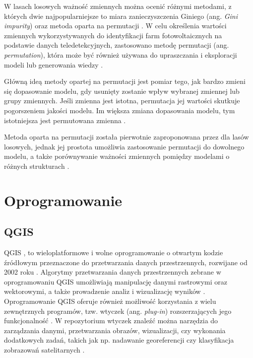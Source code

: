 \documentclass{amuthesis}
\begin{document}
W lasach losowych ważność zmiennych można ocenić różnymi metodami, z
których dwie najpopularniejsze to miara zanieczyszczenia Giniego (ang.
\emph{Gini impurity}) oraz metoda oparta na permutacji
\autocite{R-Przewodnik}. W celu określenia wartości zmiennych
wykorzystywanych do identyfikacji farm fotowoltaicznych na podstawie
danych teledetekcyjnych, zastosowano metodę permutacji (ang.
\emph{permutation}), która może być również używana do upraszczania i
eksploracji modeli lub generowania wiedzy
\autocite{biecek_2021_model_analysis}.

Główną ideą metody opartej na permutacji jest pomiar tego, jak bardzo
zmieni się dopasowanie modelu, gdy usunięty zostanie wpływ wybranej
zmiennej lub grupy zmiennych. Jeśli zmienna jest istotna, permutacja jej
wartości skutkuje pogorszeniem jakości modelu. Im większa zmiana
dopasowania modelu, tym istotniejsza jest permutowana zmienna
\autocite{biecek_2021_model_analysis}.

Metoda oparta na permutacji została pierwotnie zaproponowana przez
\textcite{breiman_2001_rf} dla lasów losowych, jednak jej prostota
umożliwia zastosowanie permutacji do dowolnego modelu, a także
porównywanie ważności zmiennych pomiędzy modelami o różnych strukturach
\autocite{biecek_2021_model_analysis}.

\hypertarget{oprogramowanie}{%
\section{Oprogramowanie}\label{oprogramowanie}}

\hypertarget{qgis}{%
\subsection{QGIS}\label{qgis}}

QGIS \autocite{qgis}, to wieloplatformowe i wolne oprogramowanie o
otwartym kodzie źródłowym przeznaczone do przetwarzania danych
przestrzennych, rozwijane od 2002 roku
\autocite{hejmanowska_2020_dane,flenniken_2020_qgis}. Algorytmy
przetwarzania danych przestrzennych zebrane w oprogramowaniu QGIS
umożliwiają manipulację danymi rastrowymi oraz wektorowymi, a także
prowadzenie analiz i wizualizację wyników
\autocite{hejmanowska_2020_dane}. Oprogramowanie QGIS oferuje również
możliwość korzystania z wielu zewnętrznych programów, tzw. wtyczek (ang.
\emph{plug-in}) rozszerzających jego funkcjonalność
\autocite{hejmanowska_2020_dane}. W repozytorium wtyczek znaleźć można
narzędzia do zarządzania danymi, przetwarzania obrazów, wizualizacji,
czy wykonania dodatkowych zadań, takich jak np. nadawanie georeferencji
czy klasyfikacja zobrazowań satelitarnych
\autocite{hejmanowska_2020_dane}.
\end{document}
